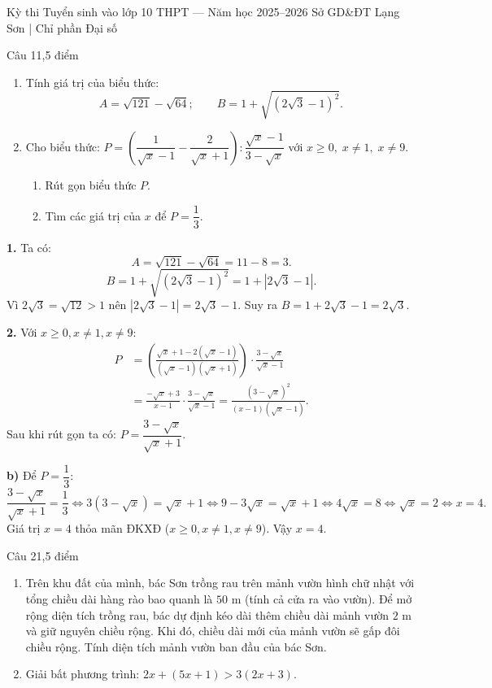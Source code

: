 ﻿%
%
  {Kỳ thi Tuyển sinh vào lớp 10 THPT — Năm học 2025--2026}%
  {Sở GD\&ĐT Lạng Sơn | Chỉ phần Đại số}

\begin{de_cau}{Câu 1}{1,5 điểm}
\begin{enumerate}[label=\arabic*.]
\item Tính giá trị của biểu thức:
\[A = \sqrt{121} - \sqrt{64};\qquad B = 1 + \sqrt{(2\sqrt{3}-1)^2}.\]
\item Cho biểu thức: $P = \left(\dfrac{1}{\sqrt{x}-1} - \dfrac{2}{\sqrt{x}+1}\right) : \dfrac{\sqrt{x}-1}{3-\sqrt{x}}$ với $x \ge 0,\; x \neq 1,\; x \neq 9$.
\begin{enumerate}[label=\alph*)]
\item Rút gọn biểu thức $P$.
\item Tìm các giá trị của $x$ để $P = \dfrac{1}{3}$.
\end{enumerate}
\end{enumerate}
\end{de_cau}

\begin{loi_giai_cau}
\textbf{1.} Ta có:
\[A = \sqrt{121} - \sqrt{64} = 11 - 8 = \boxed{3}.\]
\[B = 1 + \sqrt{(2\sqrt{3}-1)^2} = 1 + |2\sqrt{3}-1|.\]
Vì $2\sqrt{3} = \sqrt{12} > 1$ nên $|2\sqrt{3}-1| = 2\sqrt{3}-1$.
Suy ra $B = 1 + 2\sqrt{3}-1 = \boxed{2\sqrt{3}}$.

\textbf{2.} Với $x \ge 0, x \neq 1, x \neq 9$:
\begin{align*}
P &= \left(\frac{\sqrt{x}+1 - 2(\sqrt{x}-1)}{(\sqrt{x}-1)(\sqrt{x}+1)}\right) \cdot \frac{3-\sqrt{x}}{\sqrt{x}-1} \\
&= \frac{-\sqrt{x}+3}{x-1} \cdot \frac{3-\sqrt{x}}{\sqrt{x}-1} = \frac{(3-\sqrt{x})^2}{(x-1)(\sqrt{x}-1)}.
\end{align*}
Sau khi rút gọn ta có: $\boxed{P = \dfrac{3-\sqrt{x}}{\sqrt{x}+1}}$.

\textbf{b)} Để $P = \dfrac{1}{3}$:
\[\frac{3-\sqrt{x}}{\sqrt{x}+1} = \frac{1}{3} \iff 3(3-\sqrt{x}) = \sqrt{x}+1 \iff 9 - 3\sqrt{x} = \sqrt{x}+1 \iff 4\sqrt{x} = 8 \iff \sqrt{x} = 2 \iff x = 4.\]
Giá trị $x = 4$ thỏa mãn ĐKXĐ ($x \ge 0, x \neq 1, x \neq 9$).
Vậy $\boxed{x = 4}$.
\end{loi_giai_cau}

\begin{de_cau}{Câu 2}{1,5 điểm}
\begin{enumerate}[label=\arabic*.]
\item Trên khu đất của mình, bác Sơn trồng rau trên mảnh vườn hình chữ nhật với tổng chiều dài hàng rào bao quanh là $50\text{ m}$ (tính cả cửa ra vào vườn). Để mở rộng diện tích trồng rau, bác dự định kéo dài thêm chiều dài mảnh vườn $2\text{ m}$ và giữ nguyên chiều rộng. Khi đó, chiều dài mới của mảnh vườn sẽ gấp đôi chiều rộng. Tính diện tích mảnh vườn ban đầu của bác Sơn.
\item Giải bất phương trình: $2x + (5x+1) > 3(2x+3)$.
\end{enumerate}
\end{de_cau}

